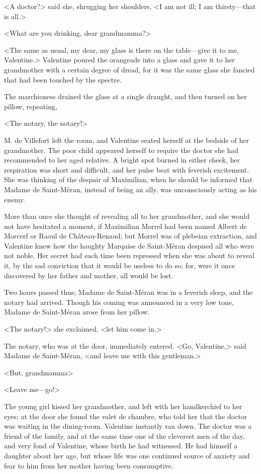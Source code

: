  <A doctor?> said she, shrugging her shoulders, <I am not ill; I am thirsty—that is all.>

<What are you drinking, dear grandmamma?> 

 <The same as usual, my dear, my glass is there on the table—give it to me, Valentine.> Valentine poured the orangeade into a glass and gave it to her grandmother with a certain degree of dread, for it was the same glass she fancied that had been touched by the spectre. 

 The marchioness drained the glass at a single draught, and then turned on her pillow, repeating, 

 <The notary, the notary!> 

 M. de Villefort left the room, and Valentine seated herself at the bedside of her grandmother. The poor child appeared herself to require the doctor she had recommended to her aged relative. A bright spot burned in either cheek, her respiration was short and difficult, and her pulse beat with feverish excitement. She was thinking of the despair of Maximilian, when he should be informed that Madame de Saint-Méran, instead of being an ally, was unconsciously acting as his enemy. 

 More than once she thought of revealing all to her grandmother, and she would not have hesitated a moment, if Maximilian Morrel had been named Albert de Morcerf or Raoul de Château-Renaud; but Morrel was of plebeian extraction, and Valentine knew how the haughty Marquise de Saint-Méran despised all who were not noble. Her secret had each time been repressed when she was about to reveal it, by the sad conviction that it would be useless to do so; for, were it once discovered by her father and mother, all would be lost. 

 Two hours passed thus; Madame de Saint-Méran was in a feverish sleep, and the notary had arrived. Though his coming was announced in a very low tone, Madame de Saint-Méran arose from her pillow. 

 <The notary!> she exclaimed, <let him come in.> 

 The notary, who was at the door, immediately entered. <Go, Valentine,> said Madame de Saint-Méran, <and leave me with this gentleman.> 

 <But, grandmamma\longdash> 

 <Leave me—go!> 

 The young girl kissed her grandmother, and left with her handkerchief to her eyes; at the door she found the valet de chambre, who told her that the doctor was waiting in the dining-room. Valentine instantly ran down. The doctor was a friend of the family, and at the same time one of the cleverest men of the day, and very fond of Valentine, whose birth he had witnessed. He had himself a daughter about her age, but whose life was one continued source of anxiety and fear to him from her mother having been consumptive. 

